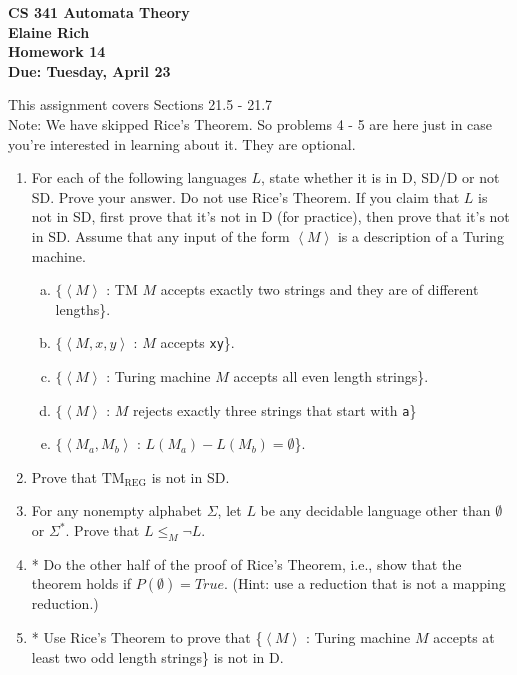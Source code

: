 \documentclass[10pt]{article}
\newcommand{\brackets}[1]{\left< #1 \right>}
\begin{document}
\begin{center}
\textbf{
CS 341 Automata Theory \\
Elaine Rich \\
Homework 14 \\
Due: Tuesday, April 23}\\
\end{center}

\noindent
This assignment covers Sections 21.5 - 21.7\\

\noindent
Note: We have skipped Rice's Theorem. So problems 4 - 5 are here just in case you're interested in learning about it. They are optional.

\begin{enumerate}[1)]


\item
For each of the following languages $L$, state whether it is in D, SD/D or not SD. Prove your answer. Do not use Rice's Theorem. If you claim that $L$ is not in SD, first prove that it's not in D (for practice), then prove that it's not in SD. Assume that any input of the form $\brackets{M}$ is a description of a Turing machine.

\begin{enumerate}[a)]

\item
$\{\brackets{M}$ : TM $M$ accepts exactly two strings and they are of different lengths\}.

\item
$\{\brackets{M, x, y}$ : $M$ accepts \texttt{xy}\}.

\item
$\{\brackets{M}$ : Turing machine $M$ accepts all even length strings\}.

\item
$\{\brackets{M}$ : $M$ rejects exactly three strings that start with \texttt{a}\}

\item
$\{\brackets{M_a, M_b}$ : $L(M_a) - L(M_b) = \emptyset$\}.
\end{enumerate}



\item
Prove that $\mathrm{TM_{REG}}$ is not in SD.


\item
For any nonempty alphabet $\Sigma$, let $L$ be any decidable language other than $\emptyset$ or $\Sigma ^*$. Prove that $L \leq _M \lnot L$.



\item
* Do the other half of the proof of Rice's Theorem, i.e., show that the theorem holds if $P(\emptyset) = True$. (Hint: use a reduction that is not a mapping reduction.)


\item
* Use Rice's Theorem to prove that \{$\brackets{M}$ : Turing machine $M$ accepts at least two odd length strings\} is not in D.
\end{enumerate}
\end{document}
